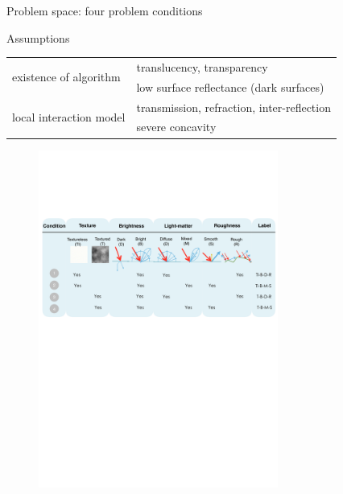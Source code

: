 \documentclass[10pt]{beamer}
\begin{document}
\begin{frame}{Problem space: four problem conditions}

\begin{exampleblock}{Assumptions}
\begin{table}
\centering
\begin{tabular}{ll}
\multirow{2}{*}{existence of algorithm} & translucency, transparency \\
& low surface reflectance (dark surfaces) \\ \cline{1-2}
\multirow{2}{*}{local interaction model} & transmission, refraction, inter-reflection \\
& severe concavity \\
\end{tabular}
\end{table}

\end{exampleblock}

\begin{figure}[h]
\includegraphics[width=0.7\textwidth]{prob_space/prob_cond}
\end{figure}

\end{frame}

\end{document}

